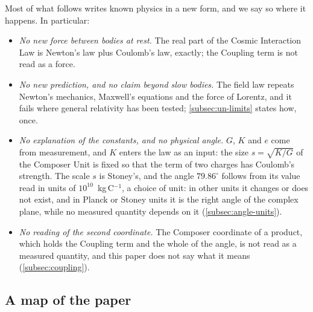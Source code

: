 \documentclass[11pt,a4paper]{article}
\theoremstyle{plain}
\theoremstyle{definition}
\theoremstyle{remark}
\begin{document}
Most of what follows writes known physics in a new form, and we say so where it happens. In particular:
\begin{itemize}[leftmargin=1.4em]
  \item \emph{No new force between bodies at rest.} The real part of the Cosmic Interaction Law is Newton's law plus Coulomb's law, exactly; the Coupling term is not read as a force.
  \item \emph{No new prediction, and no claim beyond slow bodies.} The field law repeats Newton's mechanics, Maxwell's equations and the force of Lorentz, and it fails where general relativity has been tested; \cref{subsec:un-limits} states how, once.
  \item \emph{No explanation of the constants, and no physical angle.} $G$, $K$ and $e$ come from measurement, and $K$ enters the law as an input: the size $s = \sqrt{K/G}$ of the Composer Unit is fixed so that the term of two charges has Coulomb's strength. The scale $s$ is Stoney's, and the angle $79.86^\circ$ follows from its value read in units of $10^{10}$~kg\,C$^{-1}$, a choice of unit: in other units it changes or does not exist, and in Planck or Stoney units it is the right angle of the complex plane, while no measured quantity depends on it (\cref{subsec:angle-units}).
  \item \emph{No reading of the second coordinate.} The Composer coordinate of a product, which holds the Coupling term and the whole of the angle, is not read as a measured quantity, and this paper does not say what it means (\cref{subsec:coupling}).
\end{itemize}

\subsection{A map of the paper}\label{subsec:map}
\end{document}

